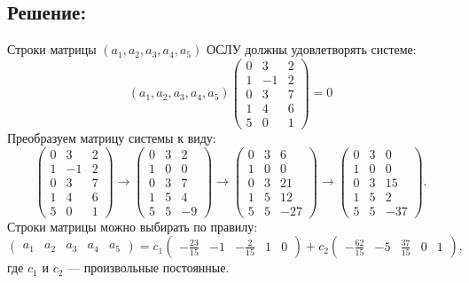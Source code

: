 \documentclass[12pt]{article}
\begin{document}
    \subsection*{Решение:}
    Строки матрицы $\left ( a_1, a_2, a_3, a_4, a_5 \right )$ ОСЛУ должны удовлетворять системе:
    \[
        \left ( a_1, a_2, a_3, a_4, a_5 \right )
        \begin{pmatrix}
            0 & 3  & 2 \\
            1 & -1 & 2 \\
            0 & 3  & 7 \\
            1 & 4  & 6 \\
            5 & 0  & 1
        \end{pmatrix}
        = 0
    \]
    Преобразуем матрицу системы к виду:
    \[
        \begin{pmatrix}
            0 & 3  & 2 \\
            1 & -1 & 2 \\
            0 & 3  & 7 \\
            1 & 4  & 6 \\
            5 & 0  & 1
        \end{pmatrix}
        \rightarrow
        \begin{pmatrix}
            0 & 3 & 2  \\
            1 & 0 & 0  \\
            0 & 3 & 7  \\
            1 & 5 & 4  \\
            5 & 5 & -9
        \end{pmatrix}
        \rightarrow
        \begin{pmatrix}
            0 & 3 & 6   \\
            1 & 0 & 0   \\
            0 & 3 & 21  \\
            1 & 5 & 12  \\
            5 & 5 & -27
        \end{pmatrix}
        \rightarrow
        \begin{pmatrix}
            0 & 3 & 0   \\
            1 & 0 & 0   \\
            0 & 3 & 15  \\
            1 & 5 & 2   \\
            5 & 5 & -37
        \end{pmatrix}
        .
    \]
    Строки матрицы можно выбирать по правилу:
    \[
        \begin{pmatrix}
            a_1 & a_2 & a_3 & a_4 & a_5
        \end{pmatrix}
        =
        c_1
        \begin{pmatrix}
            -\frac{23}{15} & -1 & -\frac{2}{15} & 1 & 0
        \end{pmatrix}
        +
        c_2
        \begin{pmatrix}
            -\frac{62}{15} & -5 & \frac{37}{15} & 0 & 1
        \end{pmatrix}
        ,
    \]
    где $c_1$ и $c_2$ --- произвольные постоянные.
\end{document}
